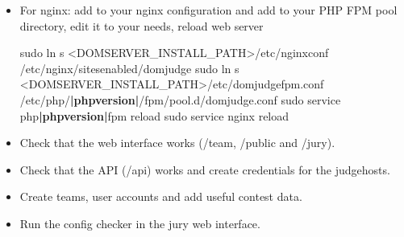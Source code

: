 \documentclass[a4paper,10pt,english,openany]{sphinxmanual}
\begin{document}
\begin{itemize}
\item {} 
\sphinxAtStartPar
For nginx: add  to your nginx configuration and
add  to your PHP FPM pool directory, edit
it to your needs, reload web server
\begin{sphinxalltt}
sudo ln \sphinxhyphen{}s \textless{}DOMSERVER\_INSTALL\_PATH\textgreater{}/etc/nginx\sphinxhyphen{}conf /etc/nginx/sites\sphinxhyphen{}enabled/domjudge
sudo ln \sphinxhyphen{}s \textless{}DOMSERVER\_INSTALL\_PATH\textgreater{}/etc/domjudge\sphinxhyphen{}fpm.conf /etc/php/{\color{red}\bfseries{}|phpversion|}/fpm/pool.d/domjudge.conf
sudo service php{\color{red}\bfseries{}|phpversion|}\sphinxhyphen{}fpm reload
sudo service nginx reload
\end{sphinxalltt}

\item {} 
\sphinxAtStartPar
Check that the web interface works (/team, /public and /jury).

\item {} 
\sphinxAtStartPar
Check that the API (/api) works and create credentials for the judgehosts.

\item {} 
\sphinxAtStartPar
Create teams, user accounts and add useful contest data.

\item {} 
\sphinxAtStartPar
Run the config checker in the jury web interface.

\end{itemize}
\end{document}
